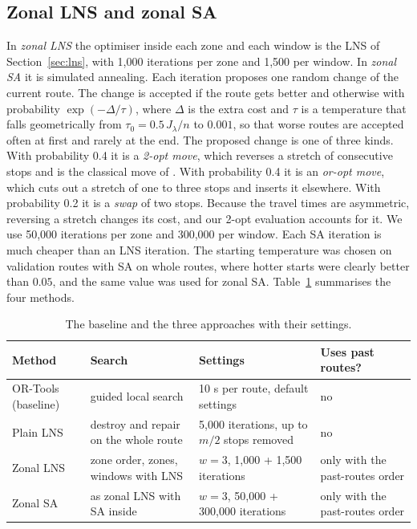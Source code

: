 \documentclass[11pt,a4paper]{article}
\newcommand{\mention}[1]{\citeauthor*{#1}}
\newcommand{\Jl}{J_\lambda}
\begin{document}
\subsection{Zonal LNS and zonal SA}\label{sec:sa}
In \emph{zonal LNS} the optimiser inside each zone and each window is the LNS of Section~\ref{sec:lns}, with 1,000 iterations per zone and 1,500 per window. In \emph{zonal SA} it is simulated annealing. Each iteration proposes one random change of the current route. The change is accepted if the route gets better and otherwise with probability $\exp(-\Delta/\tau)$, where $\Delta$ is the extra cost and $\tau$ is a temperature that falls geometrically from $\tau_0=0.5\,\Jl/n$ to $0.001$, so that worse routes are accepted often at first and rarely at the end. The proposed change is one of three kinds. With probability 0.4 it is a \emph{2-opt move}, which reverses a stretch of consecutive stops and is the classical move of \mention{croes1958}. With probability 0.4 it is an \emph{or-opt move}, which cuts out a stretch of one to three stops and inserts it elsewhere. With probability 0.2 it is a \emph{swap} of two stops. Because the travel times are asymmetric, reversing a stretch changes its cost, and our 2-opt evaluation accounts for it. We use 50,000 iterations per zone and 300,000 per window. Each SA iteration is much cheaper than an LNS iteration. The starting temperature was chosen on validation routes with SA on whole routes, where hotter starts were clearly better than $0.05$, and the same value was used for zonal SA. Table~\ref{tab:methods} summarises the four methods.

\begin{table}[t]
\centering\small
\caption{The baseline and the three approaches with their settings.}\label{tab:methods}
\begin{tabular}{p{3.0cm}p{4.2cm}p{4.2cm}p{2.6cm}}
\toprule
Method & Search & Settings & Uses past routes? \\
\midrule
OR-Tools (baseline) & guided local search & 10 s per route, default settings & no \\
Plain LNS & destroy and repair on the whole route & 5,000 iterations, up to $m/2$ stops removed & no \\
Zonal LNS & zone order, zones, windows with LNS & $w=3$, 1,000 + 1,500 iterations & only with the past-routes order \\
Zonal SA & as zonal LNS with SA inside & $w=3$, 50,000 + 300,000 iterations & only with the past-routes order \\
\bottomrule
\end{tabular}
\end{table}
\end{document}
